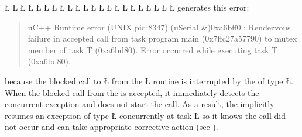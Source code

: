 \documentclass[openright,twoside]{report}
\begin{document}
\LGinlinefalse\LGbegin\lgrinde
\L{}
\L{\LB{}}
\L{}
\L{\LB{}}
\L{}
\L{\LB{}}
\L{\LB{}}
\L{}
\L{\LB{}}
\L{\LB{}}
\L{\LB{}}
\L{\LB{}}
\L{\LB{\};}}
\endlgrinde\LGend
\LGinlinefalse\LGbegin\lgrinde
\L{}
\L{\LB{}}
\L{\LB{}}
\L{\LB{}}
\L{\LB{}}
\L{\LB{}}
\L{\LB{}}
\L{\LB{}}
\L{\LB{\}}}
\endlgrinde\LGend
generates this error:
\begin{quote}
\BGfont
uC++ Runtime error (UNIX pid:8347) (uSerial \&)0xa6bff0 : Rendezvous failure in accepted call from task program main (0x7ffc27a57790) to mutex member of task T (0xa6bd80).
Error occurred while executing task T (0xa6bd80).
\end{quote}
because the blocked call to \LGinlinetrue\LGbegin\lgrinde\L{}\endlgrinde\LGend{} from the \LGinlinetrue\LGbegin\lgrinde\L{}\endlgrinde\LGend{} routine is interrupted by the  of type \LGinlinetrue\LGbegin\lgrinde\L{}\endlgrinde\LGend{}.
When the blocked call from the  is accepted, it immediately detects the concurrent exception and does not start the call.
As a result, the  implicitly resumes an exception of type \LGinlinetrue\LGbegin\lgrinde\L{}\endlgrinde\LGend{} concurrently at task \LGinlinetrue\LGbegin\lgrinde\L{}\endlgrinde\LGend{} so it knows the call did not occur and can take appropriate corrective action (see ).
\end{document}
